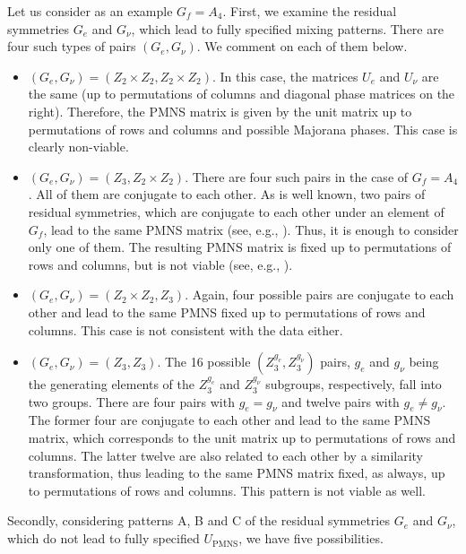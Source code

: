 \documentclass[11pt,a4paper]{article}
\numberwithin{equation}{section}
\begin{document}
 Let us consider as an example $G_f = A_4$.  
First, we examine the residual symmetries $G_e$ and $G_\nu$,
which lead to fully specified mixing patterns. 
There are four such types of pairs $(G_e,G_\nu)$. We comment on each of them below.
\begin{itemize} 
\item $(G_e,G_\nu) = (Z_2\times Z_2,Z_2\times Z_2)$.
In this case, the matrices $U_e$ and $U_\nu$ are the same 
(up to permutations of columns and diagonal phase matrices on the right).  
Therefore, the PMNS matrix is given by the unit matrix 
up to permutations of rows and columns 
and possible Majorana phases. This case is clearly non-viable.
%
\item $(G_e,G_\nu) = (Z_3,Z_2\times Z_2)$. 
There are four such pairs in the case of $G_f = A_4$. 
All of them are conjugate to each other. 
As is well known, 
two pairs of residual symmetries, which are conjugate to each other 
under an element of $G_f$, lead to the same PMNS matrix 
(see, e.g., \cite{Feruglio:2012cw,Ding:2013bpa}). 
Thus, it is enough to consider only one of them.
The resulting PMNS matrix is fixed up to permutations of rows and columns, 
but is not viable (see, e.g., \cite{Ding:2013bpa}).
%
\item $(G_e,G_\nu) = (Z_2\times Z_2,Z_3)$. 
Again, four possible pairs are conjugate to each other and lead to
the same PMNS fixed up to permutations of rows and columns. 
This case is not consistent with the data either.
%
\item $(G_e,G_\nu) = (Z_3,Z_3)$. The 16 possible $(Z_3^{g_e},Z_3^{g_\nu})$ pairs, 
$g_e$ and $g_\nu$ being the generating elements of
the $Z_3^{g_e}$ and $Z_3^{g_\nu}$ subgroups, respectively, 
fall into two groups. 
There are four pairs with $g_e = g_\nu$ 
and twelve pairs with $g_e \neq g_\nu$. 
The former four are conjugate to each other and lead to the same PMNS matrix, 
which corresponds to the unit matrix up to permutations of rows and columns.
The latter twelve are also related to each other by a similarity transformation, 
thus leading to the same PMNS matrix fixed, as always, up to permutations of 
rows and columns. This pattern is not viable as well.
\end{itemize}
%
Secondly, considering patterns A, B and C 
of the residual symmetries $G_e$ and $G_\nu$, 
which do not lead to fully specified $U_\mathrm{PMNS}$, 
we have five possibilities.
\end{document}
